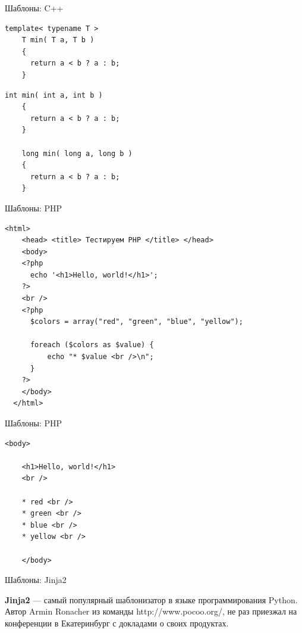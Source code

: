 \begin{frame}[fragile]{Шаблоны: C++}

  \begin{lstlisting}[style=cpp]
    template< typename T >
    T min( T a, T b )
    {
      return a < b ? a : b;
    }
  \end{lstlisting}

  \begin{lstlisting}[style=cpp]
    int min( int a, int b )
    {
      return a < b ? a : b;
    }

    long min( long a, long b )
    {
      return a < b ? a : b;
    }
  \end{lstlisting}

\end{frame}

\begin{frame}[fragile]{Шаблоны: PHP}

  \begin{lstlisting}[style=php]
  <html>
    <head> <title> Тестируем PHP </title> </head>
    <body>
    <?php
      echo '<h1>Hello, world!</h1>';
    ?>
    <br />
    <?php
      $colors = array("red", "green", "blue", "yellow");

      foreach ($colors as $value) {
          echo "* $value <br />\n";
      }
    ?>
    </body>
  </html>
  \end{lstlisting}

\end{frame}

\begin{frame}[fragile]{Шаблоны: PHP}

  \begin{lstlisting}[style=html]
    <body>

    <h1>Hello, world!</h1>
    <br />

    * red <br />
    * green <br />
    * blue <br />
    * yellow <br />

    </body>
  \end{lstlisting}

\end{frame}

\begin{frame}{Шаблоны: Jinja2}

  \textbf{Jinja2} — самый популярный шаблонизатор в языке программирования
  Python. Автор Armin Ronacher из команды http://www.pocoo.org/, не раз
  приезжал на конференции в Екатеринбург с докладами о своих продуктах.

\end{frame}


